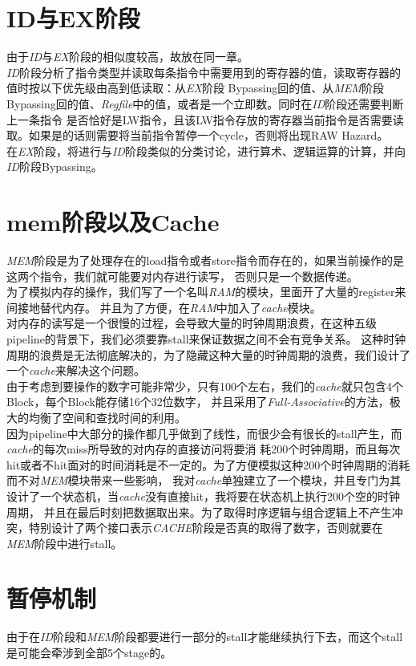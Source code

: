 \documentclass[titlepage]{article}
\begin{document}
\section{ID与EX阶段}
由于\emph{ID}与\emph{EX}阶段的相似度较高，故放在同一章。\\
\indent \emph{ID}阶段分析了指令类型并读取每条指令中需要用到的寄存器的值，读取寄存器的值时按以下优先级由高到低读取：从\emph{EX}阶段
Bypassing回的值、从\emph{MEM}阶段Bypassing回的值、\emph{Regfile}中的值，或者是一个立即数。同时在\emph{ID}阶段还需要判断上一条指令
是否恰好是LW指令，且该LW指令存放的寄存器当前指令是否需要读取。如果是的话则需要将当前指令暂停一个cycle，否则将出现RAW Hazard。\\
\indent 在\emph{EX}阶段，将进行与\emph{ID}阶段类似的分类讨论，进行算术、逻辑运算的计算，并向\emph{ID}阶段Bypassing。
\section{mem阶段以及Cache}
\emph{MEM}阶段是为了处理存在的load指令或者store指令而存在的，如果当前操作的是这两个指令，我们就可能要对内存进行读写，
否则只是一个数据传递。\\
\indent 为了模拟内存的操作，我们写了一个名叫\emph{RAM}的模块，里面开了大量的register来间接地替代内存。
并且为了方便，在\emph{RAM}中加入了\emph{cache}模块。\\
\indent 对内存的读写是一个很慢的过程，会导致大量的时钟周期浪费，在这种五级pipeline的背景下，我们必须要靠stall来保证数据之间不会有竞争关系。
这种时钟周期的浪费是无法彻底解决的，为了隐藏这种大量的时钟周期的浪费，我们设计了一个\emph{cache}来解决这个问题。\\
\indent 由于考虑到要操作的数字可能非常少，只有100个左右，我们的\emph{cache}就只包含4个Block，每个Block能存储16个32位数字，
并且采用了\emph{Full-Associative}的方法，极大的均衡了空间和查找时间的利用。\\
\indent 因为pipeline中大部分的操作都几乎做到了线性，而很少会有很长的stall产生，而\emph{cache}的每次miss所导致的对内存的直接访问将要消
耗200个时钟周期，而且每次hit或者不hit面对的时间消耗是不一定的。为了方便模拟这种200个时钟周期的消耗而不对\emph{MEM}模块带来一些影响，
我对\emph{cache}单独建立了一个模块，并且专门为其设计了一个状态机，当\emph{cache}没有直接hit，我将要在状态机上执行200个空的时钟周期，
并且在最后时刻把数据取出来。为了取得时序逻辑与组合逻辑上不产生冲突，特别设计了两个接口表示\emph{CACHE}阶段是否真的取得了数字，否则就要在\emph{MEM}阶段中进行stall。\\

\section{暂停机制}
由于在\emph{ID}阶段和\emph{MEM}阶段都要进行一部分的stall才能继续执行下去，而这个stall是可能会牵涉到全部5个stage的。
\end{document}
